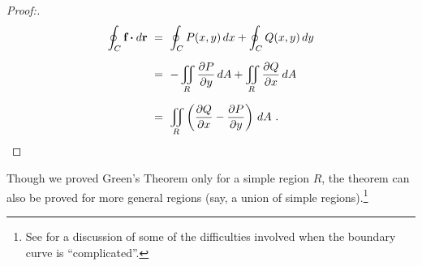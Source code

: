 \begin{proofbar}
\begin{proof}[Proof:]
 \begin{align*}
  \oint_{C} \textbf{f} \bm{\cdot} d\textbf{r} ~&=~ \oint_C P(x,y)\,dx + \oint_C Q(x,y)\,dy\\[6pt]
   &=~ -\iint\limits_{R} \frac{\partial P}{\partial y}\,dA + \iint\limits_{R} \frac{\partial Q}{\partial x}\,dA\\[6pt]
   &=~ \iint\limits_{R} \left( \frac{\partial Q}{\partial x} - \frac{\partial P}{\partial y} \right)\,dA ~.
 \end{align*}
\end{proof}\end{proofbar}

Though we proved Green's Theorem only for a simple region $R$, the theorem can also be proved for more general
regions (say, a union of simple regions).\footnote{See \cite[\S\,15.31]{tm} for a discussion of
some of the difficulties involved when the boundary curve is ``complicated''.}

